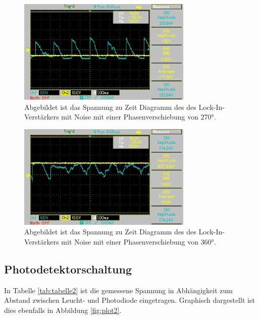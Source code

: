 \begin{figure}[H]
  \centering
  \includegraphics[height=5cm]{Bilder/n_phi270.jpg}
  \caption{Abgebildet ist das Spannung zu Zeit Diagramm des des Lock-In-Verstärkers mit Noise mit einer Phasenverschiebung von 270°.}
  \label{fig:n_phi270}
\end{figure}

\begin{figure}[H]
  \centering
  \includegraphics[height=5cm]{Bilder/n_phi360.jpg}
  \caption{Abgebildet ist das Spannung zu Zeit Diagramm des des Lock-In-Verstärkers mit Noise mit einer Phasenverschiebung von 360°.}
  \label{fig:n_phi360}
\end{figure}

\subsection{Photodetektorschaltung}
In Tabelle \ref{tab:tabelle2} ist die gemessene Spannung in Abhängigkeit zum Abstand zwischen Leucht- und Photodiode eingetragen.
Graphisch dargestellt ist dies ebenfalls in Abbildung \ref{fig:plot2}.

